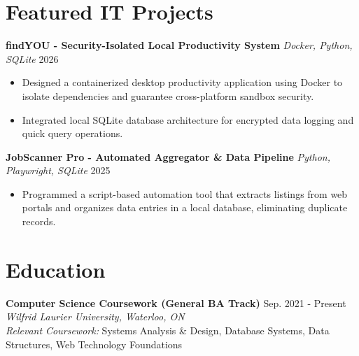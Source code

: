 \documentclass[a4paper,10pt]{article}
\begin{document}
\section*{Featured IT Projects}
\textbf{findYOU - Security-Isolated Local Productivity System} \enspace\textbar\enspace \textit{Docker, Python, SQLite} \hfill 2026
\begin{itemize}
    \item Designed a containerized desktop productivity application using Docker to isolate dependencies and guarantee cross-platform sandbox security.
    \item Integrated local SQLite database architecture for encrypted data logging and quick query operations.
\end{itemize}

\vspace{3pt}
\textbf{JobScanner Pro - Automated Aggregator & Data Pipeline} \enspace\textbar\enspace \textit{Python, Playwright, SQLite} \hfill 2025
\begin{itemize}
    \item Programmed a script-based automation tool that extracts listings from web portals and organizes data entries in a local database, eliminating duplicate records.
\end{itemize}

\section*{Education}
\textbf{Computer Science Coursework (General BA Track)} \hfill Sep. 2021 - Present \\
\textit{Wilfrid Laurier University, Waterloo, ON} \\
\textit{Relevant Coursework:} Systems Analysis \& Design, Database Systems, Data Structures, Web Technology Foundations
\end{document}
